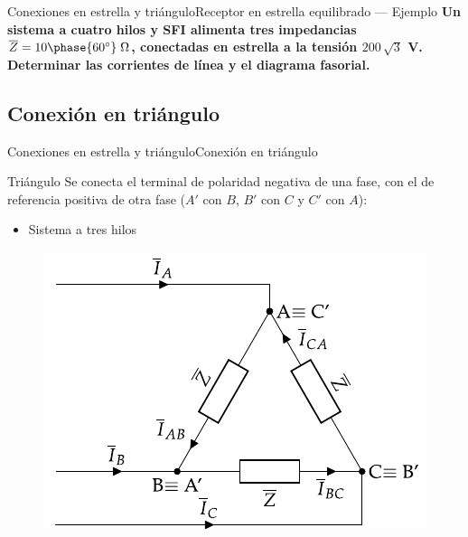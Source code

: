 \documentclass[aspectratio=169, xcolor={usenames,svgnames,dvipsnames}]{beamer}
\begin{document}
\begin{frame}{Conexiones en estrella y triángulo}{Receptor en estrella equilibrado --- Ejemplo}
    \textbf{Un sistema a cuatro hilos y SFI alimenta tres impedancias $\overline{Z}=10\phase{60^\circ}\;\Omega$, conectadas en estrella a la tensión $200\,\sqrt{3}$ V. Determinar las corrientes de línea y el diagrama fasorial.}
\end{frame}

\subsection{Conexión en triángulo}

\begin{frame}{Conexiones en estrella y triángulo}{Conexión en triángulo} 
\begin{block}{Triángulo}
    Se conecta el terminal de polaridad negativa de una fase, con el de referencia positiva de otra fase ($A'$ con $B$, $B'$ con $C$ y $C'$ con $A$):
    \begin{itemize}
        \item Sistema a tres hilos
    \end{itemize}
\end{block}

\begin{figure}
		\centering
		{\includegraphics[width=0.35\linewidth]{../figs/TrianguloEquilibrado_Receptor.pdf}}
	\end{figure}
\end{frame}
\end{document}
